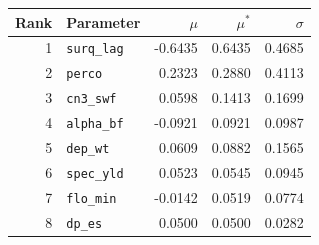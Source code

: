 \begin{tabular}{@{}rlrrr@{}}
\toprule
Rank & Parameter & $\mu$ & $\mu^*$ & $\sigma$ \\
\midrule
1 & \texttt{surq\_lag} & -0.6435 & 0.6435 & 0.4685 \\
2 & \texttt{perco} & 0.2323 & 0.2880 & 0.4113 \\
3 & \texttt{cn3\_swf} & 0.0598 & 0.1413 & 0.1699 \\
4 & \texttt{alpha\_bf} & -0.0921 & 0.0921 & 0.0987 \\
5 & \texttt{dep\_wt} & 0.0609 & 0.0882 & 0.1565 \\
6 & \texttt{spec\_yld} & 0.0523 & 0.0545 & 0.0945 \\
7 & \texttt{flo\_min} & -0.0142 & 0.0519 & 0.0774 \\
8 & \texttt{dp\_es} & 0.0500 & 0.0500 & 0.0282 \\
\bottomrule
\end{tabular}
